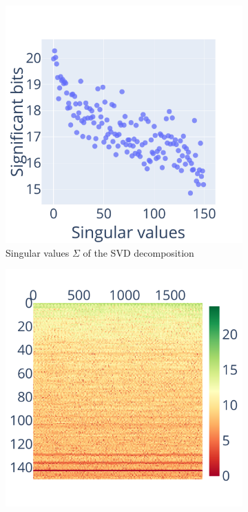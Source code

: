 \documentclass[10pt,journal,compsoc]{IEEEtran}
\begin{document}
\begin{figure}
\begin{subfigure}{0.3\linewidth}
        \includegraphics[width=\linewidth]{figure/face_recognition/svd_ret_S_sig.pdf}
        \caption{Singular values $\Sigma$ of the SVD decomposition}
        \label{fig:randomized_svd_S}
    \end{subfigure}
    \begin{subfigure}{0.3\linewidth}
        \includegraphics[width=\linewidth]{figure/face_recognition/randomized_svd_ret_V_sig.pdf}

\end{subfigure}
\end{figure}
\end{document}

